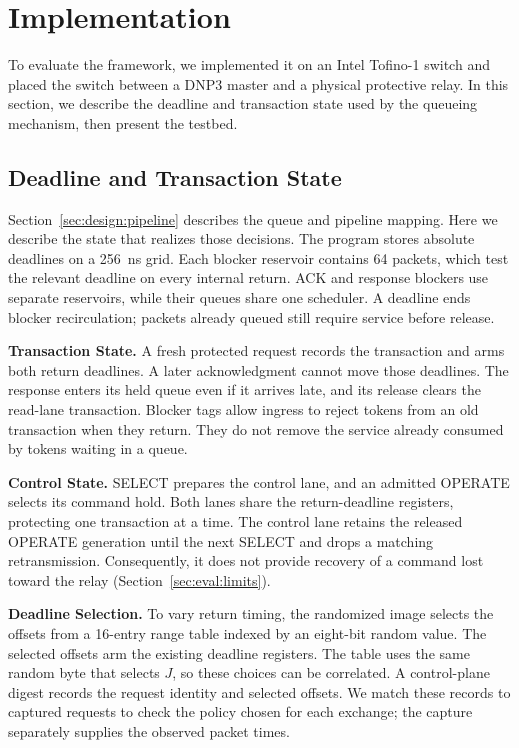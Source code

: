 \section{Implementation}
\label{sec:impl}

To evaluate the framework, we implemented it on an Intel Tofino-1 switch and placed the switch
between a DNP3 master and a physical protective relay. In this section, we describe the deadline and transaction state used by the
queueing mechanism, then present the testbed.

\subsection{Deadline and Transaction State}
\label{sec:impl:queues}
\label{sec:impl:walkthrough}

Section~\ref{sec:design:pipeline} describes the queue and pipeline mapping. Here we describe the
state that realizes those decisions. The program stores absolute deadlines on a 256~ns grid.
Each blocker reservoir contains 64 packets, which test the relevant deadline on every internal
return. ACK and response blockers use separate reservoirs, while their queues share one scheduler.
A deadline ends blocker recirculation; packets already queued still require service before release.

\textbf{Transaction State.} A fresh protected request records the transaction and arms both
return deadlines. A later acknowledgment cannot move those deadlines. The response enters its
held queue even if it arrives late, and its release clears the read-lane transaction. Blocker tags
allow ingress to reject tokens from an old transaction when they return. They do not remove the
service already consumed by tokens waiting in a queue.

\textbf{Control State.} SELECT prepares the control lane, and an admitted OPERATE selects its
command hold. Both lanes share the return-deadline registers, protecting one transaction at a time.
The control lane retains the released OPERATE generation until the next SELECT and drops a matching
retransmission. Consequently, it does not provide recovery of a command lost toward the relay
(Section~\ref{sec:eval:limits}).

\textbf{Deadline Selection.} To vary return timing, the randomized image selects the offsets from
a 16-entry range table indexed by an eight-bit random value. The selected offsets arm the existing
deadline registers. The table uses the same random byte that selects $J$, so these choices can be
correlated. A control-plane digest records the request identity and selected offsets. We match
these records to captured requests to check the policy chosen for each exchange; the capture
separately supplies the observed packet times.

